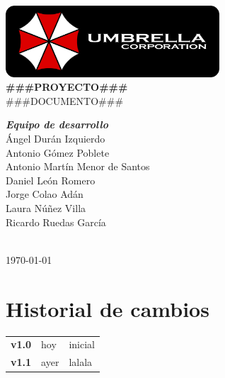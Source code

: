 \documentclass[a4paper,11pt,oneside]{report}
\begin{document}
\renewcommand\listtablename{Índice de tablas}
\renewcommand\tablename{Tabla}

\pagestyle{plain}



\begin{titlepage}
\begin{center}

\includegraphics[width=0.6\textwidth]{logo-umbrella.png}\\[4cm]

{\huge \textbf{\#\#\#PROYECTO\#\#\#}}\\[0.5cm]
{\huge {\#\#\#DOCUMENTO\#\#\#}}\\[4cm]

\begin{minipage}{0.5\textwidth}
\large
\hspace{1cm}\textbf{\emph{Equipo de desarrollo}}\\
Ángel Durán Izquierdo\\
Antonio Gómez Poblete\\
Antonio Martín Menor de Santos\\
Daniel León Romero\\
Jorge Colao Adán\\
Laura Núñez Villa\\
Ricardo Ruedas García\\
\end{minipage}\\[2cm]

{\Large \today}
\end{center}
\end{titlepage}


\clearpage
{}

\chapter*{Historial de cambios}
\setcounter{page}{2}

\begin{center}
\begin{tabularx}{\textwidth}{p{}p{}X}
\textbf{v1.0} & hoy & inicial\\
\textbf{v1.1} & ayer & lalala
\end{tabularx}
\end{center}
\end{document}
